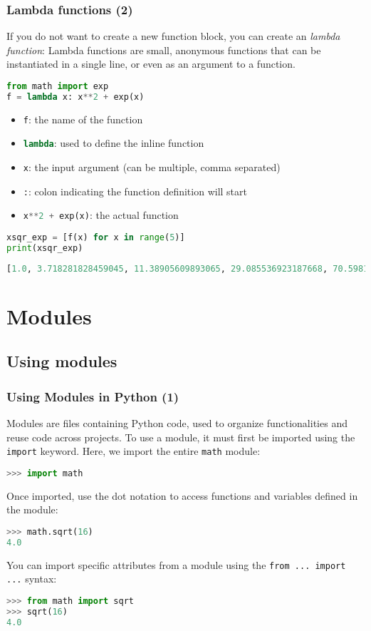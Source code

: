 \begin{frame}[fragile]
  \frametitle{Lambda functions (2)}
  If you do not want to create a new function block, you can create an \emph{lambda function}:
  Lambda functions are small, anonymous functions that can be instantiated in a single line, or even as an argument to a function.
  \begin{lstlisting}[language=Python]
from math import exp
f = lambda x: x**2 + exp(x)
  \end{lstlisting}
  \pause
  \begin{itemize}
    \item \lstinline[language=Python]|f|: the name of the function
    \item \lstinline[language=Python]|lambda|: used to define the inline function
    \item \lstinline[language=Python]|x|: the input argument (can be multiple, comma separated)
    \item \lstinline|:|: colon indicating the function definition will start
    \item \lstinline[language=Python]|x**2 + exp(x)|: the actual function
  \end{itemize}\pause
  \begin{lstlisting}[language=Python]
xsqr_exp = [f(x) for x in range(5)]
print(xsqr_exp)
  \end{lstlisting}
  \begin{lstlisting}[language=Python]
[1.0, 3.718281828459045, 11.38905609893065, 29.085536923187668, 70.59815003314424]
  \end{lstlisting}
\end{frame}

\section{Modules}
\subsection{Using modules}
\begin{frame}[fragile]
  \frametitle{Using Modules in Python (1)}
  Modules are files containing Python code, used to organize functionalities and reuse code across projects. To use a module, it must first be imported using the \lstinline{import} keyword. Here, we import the entire \lstinline{math} module:
  \begin{lstlisting}[language=Python, numbers=none]
>>> import math
  \end{lstlisting}\pause
  Once imported, use the dot notation to access functions and variables defined in the module:
  \begin{lstlisting}[language=Python, numbers=none]
>>> math.sqrt(16)
4.0
  \end{lstlisting}\pause
  You can import specific attributes from a module using the \lstinline{from ... import ...} syntax:
  \begin{lstlisting}[language=Python, numbers=none]
>>> from math import sqrt
>>> sqrt(16)
4.0
  \end{lstlisting}
\end{frame}

